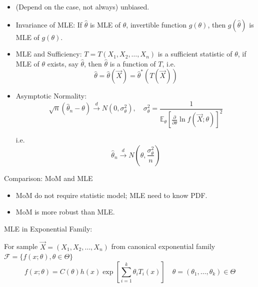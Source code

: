         
    \begin{itemize}
        \item (Depend on the case, not always) unbiased.
        \item Invariance of MLE: If $\hat{\theta}$ is MLE of $\theta$, invertible function $g(\theta)$, then $g(\hat{\theta})$ is MLE of $g(\theta)$.
        \item MLE and Sufficiency: $T=T(X_1,X_2,\ldots,X_n)$ is a sufficient statistic of $\theta$, if MLE of $\theta$ exists, say $\hat{\theta}$, then $\hat{\theta}$ is a function of $T$, i.e.
        \begin{equation}  
            \hat{\theta}=\hat{\theta}(\vec{X})=\hat{\theta}^*(T(\vec{X}))    
        \end{equation}
        \item Asymptotic Normality: 
        \begin{equation}
            \sqrt{n}(\hat{\theta}_n-\theta) \xrightarrow[]{d}N(0,\sigma^2_\theta),\quad \sigma^2_\theta=\frac{1}{\mathbb{E}_\theta[\frac{\partial}{\partial\theta}\ln f(\vec{X};\theta)]^2}   
        \end{equation}

        i.e.
        \begin{equation}
            \hat{\theta}_n\xrightarrow[]{d}N(\theta,\frac{\sigma^2_\theta}{n})    
        \end{equation}
        
    \end{itemize}

    \begin{point}
        Comparison: MoM and MLE
    \end{point}
    
        
    \begin{itemize}
        \item MoM do not require statistic model; MLE need to know PDF.
        \item MoM is more robust than MLE.
    \end{itemize}


    MLE in Exponential Family:

        For sample $\vec{X}=(X_1,X_2,\ldots,X_n)$ from canonical exponential family $\mathscr{F}=\{f(x;\theta),\theta\in\Theta\}$
        \begin{equation}
            f(x;\theta)=C(\theta)h(x)\exp\left[\sum_{i=1}^k\theta_iT_i(x)\right]\quad \theta=(\theta_1,\ldots,\theta_k)\in\Theta
        \end{equation}

